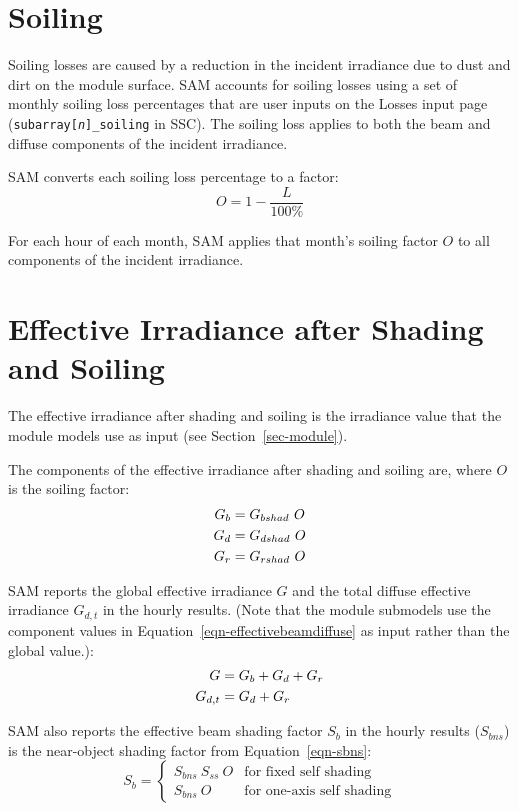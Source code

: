 \documentclass[12pt,letterpaper]{article}
\begin{document}
\section{Soiling}\label{sec-soiling}

Soiling losses are caused by a reduction in the incident irradiance due to dust and dirt on the module surface. SAM accounts for soiling losses using a set of monthly soiling loss percentages that are user inputs on the Losses input page (\texttt{subarray[\textit{n}]\_soiling} in SSC). The soiling loss applies to both the beam and diffuse components of the incident irradiance.

SAM converts each soiling loss percentage to a factor:
\begin{equation}
O=1-\frac{L}{100\%}
\end{equation}

For each hour of each month, SAM applies that month's soiling factor $O$ to all components of the incident irradiance.

\section{Effective Irradiance after Shading and Soiling}

The effective irradiance after shading and soiling is the irradiance value that the module models use as input (see Section~\ref{sec-module}).

The components of the effective irradiance after shading and soiling are, where $O$ is the soiling factor:
\begin{align} \label{eqn-effectivebeamdiffuse}
G_b &= G_{bshad}~O \notag\\
G_d &= G_{dshad}~O\notag\\
G_r &=  G_{rshad}~O
\end{align}

SAM reports the global effective irradiance $G$ and the total diffuse effective irradiance $G_{d,t}$ in the hourly results. (Note that the module submodels use the component values in Equation~\ref{eqn-effectivebeamdiffuse} as input rather than the global value.):
\begin{align}
G &= G_b + G_d + G_r\notag\\
G_{d,t} & = G_d + G_r
\end{align}

SAM also reports the effective beam shading factor $S_b$ in the hourly results ($S_{bns}$) is the near-object shading factor from Equation~\ref{eqn-sbns}:
\begin{equation}
S_b = \left\{
\begin{array}{ll}
S_{bns}~S_{ss}~O &\text{for fixed self shading}\\
S_{bns}~O &\text{for one-axis self shading} 
\end{array}
\right.
\end{equation}
\end{document}
